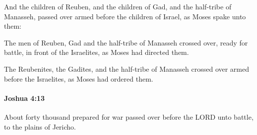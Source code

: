 			\begin{versebox}
					\item[BHS] 
					\item[ASV] And the children of Reuben, and the children of Gad, and the half-tribe of Manasseh, passed over armed before the children of Israel, as Moses spake unto them:
					\item[NIV] The men of Reuben, Gad and the half-tribe of Manasseh crossed over, ready for battle, in front of the Israelites, as Moses had directed them.
					\item[NRSV] The Reubenites, the Gadites, and the half-tribe of Manasseh crossed over armed before the Israelites, as Moses had ordered them.
			\end{versebox}

		\paragraph{Joshua 4:13} %
			\label{JOSHUA-4-13}

			About forty thousand prepared for war passed over before the LORD unto battle, to the plains of Jericho.

